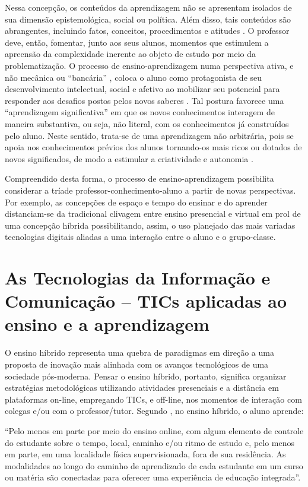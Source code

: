 \documentclass[
	12pt,				%
	openright,			%
  oneside,     %
	a4paper,			%
	chapter=TITLE,		%
	english,			%
	french,				%
	spanish,			%
	brazil				%
	]{abntex2}
\begin{document}
Nessa concepção, os conteúdos da aprendizagem não se apresentam isolados de sua dimensão epistemológica, social ou política. Além disso, tais conteúdos são abrangentes, incluindo fatos, conceitos, procedimentos e atitudes \cite{zabala1988pratica}. O professor deve, então, fomentar, junto aos seus alunos, momentos que estimulem a apreensão da complexidade inerente ao objeto de estudo por meio da problematização. O processo de ensino-aprendizagem numa perspectiva ativa, e não mecânica ou “bancária” \cite{freire2014pedagogia}, coloca o aluno como protagonista de seu desenvolvimento intelectual, social e afetivo ao mobilizar seu potencial para responder aos desafios postos pelos novos saberes \cite{berbel2019metodologias}. Tal postura favorece uma “aprendizagem significativa” em que os novos conhecimentos interagem de maneira substantiva, ou seja, não literal, com os conhecimentos já construídos pelo aluno. Neste sentido, trata-se de uma aprendizagem não arbitrária, pois se apoia nos conhecimentos prévios dos alunos tornando-os mais ricos ou dotados de novos significados, de modo a estimular a criatividade e autonomia \cite{moreira2010aprendizagemsignificativa}.

Compreendido desta forma, o processo de ensino-aprendizagem possibilita considerar a tríade professor-conhecimento-aluno a partir de novas perspectivas. Por exemplo, as concepções de espaço e tempo do ensinar e do aprender distanciam-se da tradicional clivagem entre ensino presencial e virtual em prol de uma concepção híbrida possibilitando, assim, o uso planejado das mais variadas tecnologias digitais aliadas a uma interação entre o aluno e o grupo-classe.

\section{As Tecnologias da Informação e Comunicação – TICs aplicadas ao ensino e a aprendizagem}

O ensino híbrido representa uma quebra de paradigmas em direção a uma proposta de inovação mais alinhada com os avanços tecnológicos de uma sociedade pós-moderna. Pensar o ensino híbrido, portanto, significa organizar estratégias metodológicas utilizando atividades presenciais e a distância em plataformas on-line, empregando TICs, e off-line, nos momentos de interação com colegas e/ou com o professor/tutor. Segundo \cite{christensen2013ensino}, no ensino híbrido, o aluno aprende:

\begin{citacao}
    “Pelo menos em parte por meio do ensino online, com algum elemento de controle do estudante sobre o tempo, local, caminho e/ou ritmo de estudo e, pelo menos em parte, em uma localidade física supervisionada, fora de sua residência. As modalidades ao longo do caminho de aprendizado de cada estudante em um curso ou matéria são conectadas para oferecer uma experiência de educação integrada”.
\end{citacao}
\end{document}

